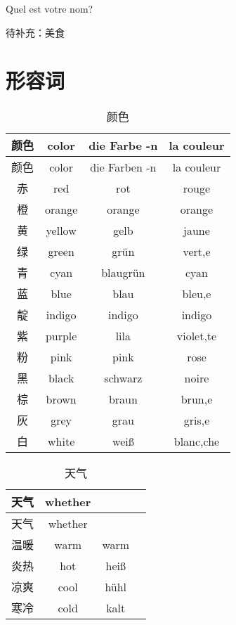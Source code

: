 \documentclass[12pt,A4paper,oneside,reqno]{amsart}
\numberwithin{equation}{section}
\theoremstyle{plain}
\theoremstyle{plain}
\theoremstyle{plain}
\numberwithin{equation}{section}
\theoremstyle{remark}
\begin{document}
Quel est votre nom?

待补充：美食

\section{形容词}

\begin{longtable}{c|c|c|c}
	\hline
颜色	&	color	&	die Farbe -n	&	la couleur	\\

	\hline
	\endhead
	\hline
颜色	&	color	&	die Farben -n	&	la couleur	\\

	\hline
	\endfirsthead	
	\hline
	\endfoot
	\hline		
	\caption{颜色}
	\endlastfoot				
赤	&	red	&	rot	&	rouge	\\
橙	&	orange	&	orange	&	orange	\\
黄	&	yellow	&	gelb	&	jaune	\\
绿	&	green	&	grün	&	vert,e	\\
青	&	cyan	&	blaugrün	&	cyan	\\
蓝	&	blue	&	blau	&	bleu,e	\\
靛	&	indigo	&	indigo	&	indigo	\\
紫	&	purple	&	lila	&	violet,te	\\
粉	&	pink	&	pink	&	rose	\\
黑	&	black	&	schwarz	&	noire	\\
棕	&	brown	&	braun	&	brun,e	\\
灰	&	grey	&	grau	&	gris,e	\\
白	&	white	&	weiß	&	blanc,che	\\

	
\end{longtable}
\begin{longtable}{c|c|c|c}
	\hline
	天气	&	whether	&		&		\\
	
	\hline
	\endhead
	\hline
	天气	&	whether	&		&		\\
	
	\hline
	\endfirsthead	
	\hline
	\endfoot
	\hline		
	\caption{天气}
	\endlastfoot				
温暖	&	warm	&	warm	&		\\
炎热	&	hot	&	hei\ss	&		\\
凉爽	&	cool	&	h\"{u}hl	&		\\
寒冷	&	cold	&	kalt	&		\\

	
\end{longtable}
\end{document}
